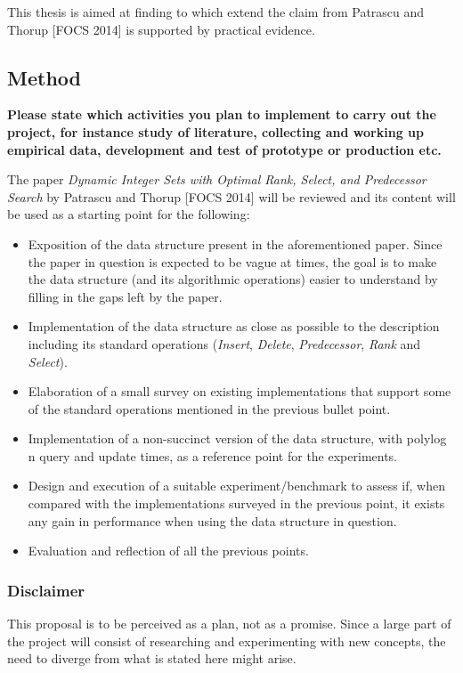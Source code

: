 This thesis is aimed at finding to which extend the claim from Patrascu and Thorup [FOCS 2014] is supported by practical evidence.

\subsection{Method} 

\textbf{Please state which activities you plan to implement to carry out the project, for instance study of literature, collecting and working up empirical data, development and test of prototype or production etc.}

The paper \textit{Dynamic Integer Sets with Optimal Rank, Select, and Predecessor Search} by Patrascu and Thorup [FOCS 2014] will be reviewed and its content will be used as a starting point for the following:
\begin{itemize}
    \item Exposition of the data structure present in the aforementioned paper. Since the paper in question is expected to be vague at times, the goal is to make the data structure (and its algorithmic operations) easier to understand by filling in the gaps left by the paper.
    \item Implementation of the data structure as close as possible to the description including its standard operations (\textit{Insert}, \textit{Delete}, \textit{Predecessor}, \textit{Rank} and \textit{Select}).
    \item Elaboration of a small survey on existing implementations that support some of the standard operations mentioned in the previous bullet point.
    \item Implementation of a non-succinct version of the data structure, with polylog n query and update times, as a reference point for the experiments.
    \item Design and execution of a suitable experiment/benchmark to assess if, when compared with the implementations surveyed in the previous point, it exists any gain in performance when using the data structure in question.
    \item Evaluation and reflection of all the previous points.
\end{itemize}

\subsubsection{Disclaimer}
This proposal is to be perceived as a plan, not as a promise. Since a large part of the project will consist of researching and experimenting with new concepts, the need to diverge from what is stated here might arise.


